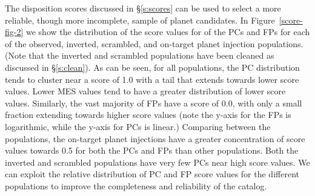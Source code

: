 The disposition scores discussed in \S\ref{s:scores} can be used to select a more reliable, though more incomplete, sample of planet candidates. In Figure~\ref{score-fig-2} we show the distribution of the score values for of the PCs and FPs for each of the observed, inverted, scrambled, and on-target planet injection populations. (Note that the inverted and scrambled populations have been cleaned as discussed in \S\ref{s:clean}). As can be seen, for all populations, the PC distribution tends to cluster near a score of 1.0 with a tail that extends towards lower score values. Lower MES values tend to have a greater distribution of lower score values. Similarly, the vast majority of FPs have a score of 0.0, with only a small fraction extending towards higher score values (note the y-axis for the FPs is logarithmic, while the y-axis for PCs is linear.) Comparing between the populations, the on-target planet injections have a greater concentration of score values towards 0.5 for both the PCs and FPs than other populations. Both the inverted and scrambled populations have very few PCs near high score values. We can exploit the relative distribution of PC and FP score values for the different populations to improve the completeness and reliability of the catalog.

